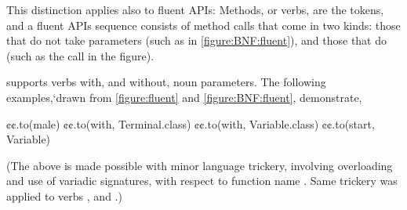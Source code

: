 This distinction applies also to fluent APIs:
Methods, or verbs, are the tokens, and a fluent APIs sequence consists of
method calls that come in two kinds: those that do not take parameters (such as  in \cref{figure:BNF:fluent}),
and those that do (such as the call  in the figure).

\Self supports verbs with, and without, noun parameters.
The following examples,`drawn from \cref{figure:fluent} and \cref{figure:BNF:fluent},
demonstrate,
\begin{JAVA}
  ¢¢.to(male)
  ¢¢.to(with, Terminal.class)
  ¢¢.to(with, Variable.class)
  ¢¢.to(start, Variable)\end{JAVA}
(The above is made possible with minor \Java language trickery,
  involving overloading and use of variadic signatures,
  with respect to function name .
Same trickery was applied to verbs , and .)
